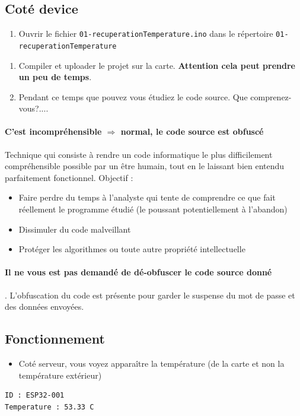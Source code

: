 \documentclass[french, 12pt]{article}%
\newcommand{\itemE}{\item[$\bullet$]}
\newcommand{\titreencadre}{Titre}
\newenvironment{encadre}[1]{\renewcommand{\titreencadre}{#1}
	\begin{mdframed}[style=encadrestyle]
	\vspace{0.5\baselineskip}
	}{%
	\end{mdframed}}
\begin{document}
\subsection{Coté device}

\begin{enumerate} [resume]
\item Ouvrir  le fichier \verb?01-recuperationTemperature.ino? dans le répertoire \verb?01-recuperationTemperature? 
\end{enumerate}
%

\begin{enumerate} [resume]
\item Compiler et uploader le projet sur la carte. \textbf{Attention cela peut prendre un peu de temps}.
\item Pendant ce temps que pouvez vous étudiez le code source. Que comprenez-vous?.... 
\end{enumerate}

\paragraph{C'est incompréhensible $\Rightarrow$ normal, le code source est obfuscé}


\begin{encadre}{Obfuscation}
Technique qui consiste à rendre un code informatique le plus difficilement compréhensible possible par un être humain, tout en le laissant bien entendu parfaitement fonctionnel. Objectif : 
\begin{itemize}
\itemE Faire  perdre du temps à l’analyste qui tente de comprendre ce que fait réellement le programme étudié (le poussant potentiellement à l'abandon)
\itemE Dissimuler du code malveillant
\itemE Protéger les algorithmes ou toute autre propriété intellectuelle
\end{itemize}
\end{encadre}

\paragraph{Il ne vous est pas demandé de dé-obfuscer le code source donné}. L'obfuscation du code est présente pour garder le suspense du mot de passe et des données envoyées. 




\subsection{Fonctionnement}
\begin{itemize}
\itemE Coté serveur, vous voyez apparaître la température (de la carte et non la température extérieur)
\end{itemize}
\begin{lstlisting}[style=commande]
ID : ESP32-001
Temperature : 53.33 C
\end{lstlisting}
\end{document}
